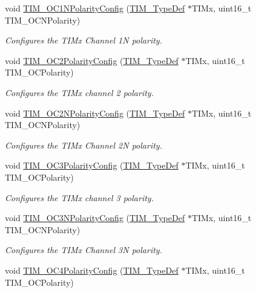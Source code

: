 \begin{DoxyCompactItemize}
void \hyperlink{group___t_i_m_ga3cb91578e7dd34ea7d09862482960445}{T\+I\+M\+\_\+\+O\+C1\+N\+Polarity\+Config} (\hyperlink{struct_t_i_m___type_def}{T\+I\+M\+\_\+\+Type\+Def} $\ast$T\+I\+Mx, uint16\+\_\+t T\+I\+M\+\_\+\+O\+C\+N\+Polarity)
\begin{DoxyCompactList}\small\item\em Configures the T\+I\+Mx Channel 1N polarity. \end{DoxyCompactList}\item 
void \hyperlink{group___t_i_m_ga6831cacaac1ef50291af94db94450797}{T\+I\+M\+\_\+\+O\+C2\+Polarity\+Config} (\hyperlink{struct_t_i_m___type_def}{T\+I\+M\+\_\+\+Type\+Def} $\ast$T\+I\+Mx, uint16\+\_\+t T\+I\+M\+\_\+\+O\+C\+Polarity)
\begin{DoxyCompactList}\small\item\em Configures the T\+I\+Mx channel 2 polarity. \end{DoxyCompactList}\item 
void \hyperlink{group___t_i_m_ga2fa6ea3a89f446b52b4e699272b70cad}{T\+I\+M\+\_\+\+O\+C2\+N\+Polarity\+Config} (\hyperlink{struct_t_i_m___type_def}{T\+I\+M\+\_\+\+Type\+Def} $\ast$T\+I\+Mx, uint16\+\_\+t T\+I\+M\+\_\+\+O\+C\+N\+Polarity)
\begin{DoxyCompactList}\small\item\em Configures the T\+I\+Mx Channel 2N polarity. \end{DoxyCompactList}\item 
void \hyperlink{group___t_i_m_ga1ef43b03fe666495e80aac9741ae7ab0}{T\+I\+M\+\_\+\+O\+C3\+Polarity\+Config} (\hyperlink{struct_t_i_m___type_def}{T\+I\+M\+\_\+\+Type\+Def} $\ast$T\+I\+Mx, uint16\+\_\+t T\+I\+M\+\_\+\+O\+C\+Polarity)
\begin{DoxyCompactList}\small\item\em Configures the T\+I\+Mx channel 3 polarity. \end{DoxyCompactList}\item 
void \hyperlink{group___t_i_m_gac710acc5b682e892584fc6f089f61dc2}{T\+I\+M\+\_\+\+O\+C3\+N\+Polarity\+Config} (\hyperlink{struct_t_i_m___type_def}{T\+I\+M\+\_\+\+Type\+Def} $\ast$T\+I\+Mx, uint16\+\_\+t T\+I\+M\+\_\+\+O\+C\+N\+Polarity)
\begin{DoxyCompactList}\small\item\em Configures the T\+I\+Mx Channel 3N polarity. \end{DoxyCompactList}\item 
void \hyperlink{group___t_i_m_gad678410f7c7244f83daad93ce9d1056e}{T\+I\+M\+\_\+\+O\+C4\+Polarity\+Config} (\hyperlink{struct_t_i_m___type_def}{T\+I\+M\+\_\+\+Type\+Def} $\ast$T\+I\+Mx, uint16\+\_\+t T\+I\+M\+\_\+\+O\+C\+Polarity)

\end{DoxyCompactItemize}
